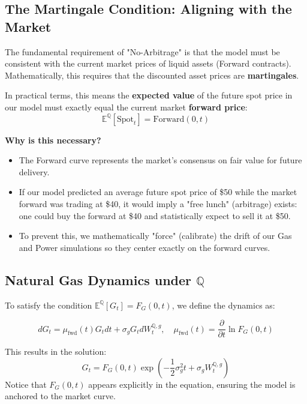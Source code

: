 \documentclass{article}
\begin{document}
\subsection{The Martingale Condition: Aligning with the Market}

The fundamental requirement of "No-Arbitrage" is that the model must be consistent with the current market prices of liquid assets (Forward contracts). Mathematically, this requires that the discounted asset prices are \textbf{martingales}.

In practical terms, this means the \textbf{expected value} of the future spot price in our model must exactly equal the current market \textbf{forward price}:
\[
\mathbb E^{\mathbb Q}[\text{Spot}_t] = \text{Forward}(0,t)
\]

\textbf{Why is this necessary?}
\begin{itemize}
    \item The Forward curve represents the market's consensus on fair value for future delivery.
    \item If our model predicted an average future spot price of \$50 while the market forward was trading at \$40, it would imply a "free lunch" (arbitrage) exists: one could buy the forward at \$40 and statistically expect to sell it at \$50.
    \item To prevent this, we mathematically "force" (calibrate) the drift of our Gas and Power simulations so they center exactly on the forward curves.
\end{itemize}

\subsection{Natural Gas Dynamics under $\mathbb Q$}

To satisfy the condition $\mathbb E^{\mathbb Q}[G_t] = F_G(0,t)$, we define the dynamics as:

\begin{equation}
dG_t = \mu_{\mathrm{fwd}}(t) G_t dt + \sigma_g G_t dW_t^{\mathbb Q,g},
\quad
\mu_{\mathrm{fwd}}(t) = \frac{\partial}{\partial t} \ln F_G(0,t)
\end{equation}

This results in the solution:
\begin{equation}
    G_{t} = F_G(0, t) \exp\left(-\frac{1}{2} \sigma_{g}^{2} t + \sigma_{g} W_t^{\mathbb Q,g}\right)
\end{equation}
Notice that $F_G(0,t)$ appears explicitly in the equation, ensuring the model is anchored to the market curve.
\end{document}
